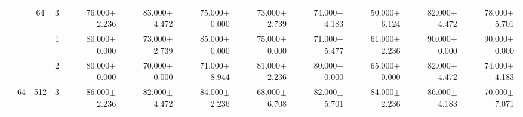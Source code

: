 \begin{table}[htpb]
{\begin{tabular}{c|c|c|c|rr|rr|rr|rr}
                                 &                                                                                 & \multirow{-3}{*}{64}                                                                   & 3                                                                                         & 76.000$\pm$2.236                        & 83.000$\pm$4.472                        & 75.000$\pm$0.000                        & 73.000$\pm$2.739                        & 74.000$\pm$4.183                         & 50.000$\pm$6.124                         & 82.000$\pm$4.472                        & 78.000$\pm$5.701                       \\ \cline{3-12} 
                                 &                                                                                 &                                                                                        & 1                                                                                         & 80.000$\pm$0.000                        & 73.000$\pm$2.739                        & 85.000$\pm$0.000                        & 75.000$\pm$0.000                        & 71.000$\pm$5.477                         & 61.000$\pm$2.236                         & 90.000$\pm$0.000                        & 90.000$\pm$0.000                       \\
                                 &                                                                                 &                                                                                        & 2                                                                                         & 80.000$\pm$0.000                        & 70.000$\pm$0.000                        & 71.000$\pm$8.944                        & 81.000$\pm$2.236                        & 80.000$\pm$0.000                         & 65.000$\pm$0.000                         & 82.000$\pm$4.472                        & 74.000$\pm$4.183                       \\
                                 & \multirow{-6}{*}{64}                                                            & \multirow{-3}{*}{512}                                                                  & 3                                                                                         & 86.000$\pm$2.236                        & 82.000$\pm$4.472                        & 84.000$\pm$2.236                        & 68.000$\pm$6.708                        & 82.000$\pm$5.701                         & 84.000$\pm$2.236                         & 86.000$\pm$4.183                        & 70.000$\pm$7.071                       \\ \cline{2-12} 

\end{tabular}}
\end{table}
